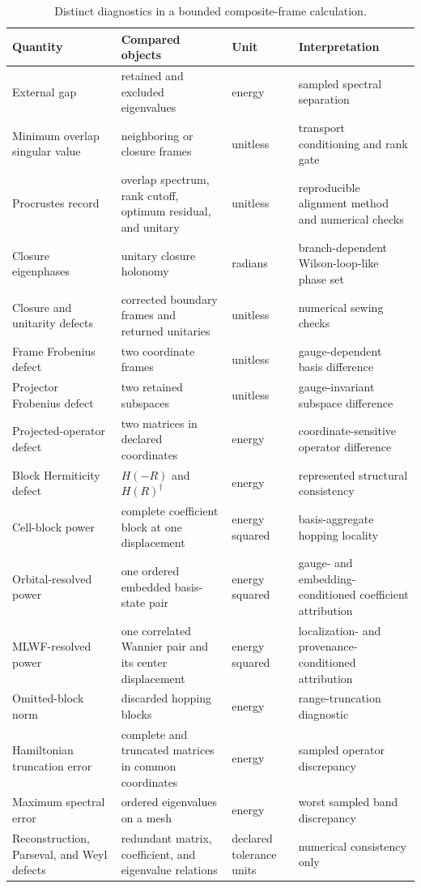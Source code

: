 \begin{table}[htbp]
  \centering
  \caption{Distinct diagnostics in a bounded composite-frame calculation.}
  \label{tab:training-composite-diagnostics}
  \footnotesize
  \begin{tabular}{@{}p{}p{}p{}p{}@{}}
    \toprule
    Quantity & Compared objects & Unit & Interpretation \\
    \midrule
    External gap & retained and excluded eigenvalues & energy & sampled spectral separation \\
    Minimum overlap singular value & neighboring or closure frames & unitless & transport conditioning and rank gate \\
    Procrustes record & overlap spectrum, rank cutoff, optimum residual, and unitary & unitless & reproducible alignment method and numerical checks \\
    Closure eigenphases & unitary closure holonomy & radians & branch-dependent Wilson-loop-like phase set \\
    Closure and unitarity defects & corrected boundary frames and returned unitaries & unitless & numerical sewing checks \\
    Frame Frobenius defect & two coordinate frames & unitless & gauge-dependent basis difference \\
    Projector Frobenius defect & two retained subspaces & unitless & gauge-invariant subspace difference \\
    Projected-operator defect & two matrices in declared coordinates & energy & coordinate-sensitive operator difference \\
    Block Hermiticity defect & $H(-R)$ and $H(R)^{\dagger}$ & energy & represented structural consistency \\
    Cell-block power & complete coefficient block at one displacement & energy squared & basis-aggregate hopping locality \\
    Orbital-resolved power & one ordered embedded basis-state pair & energy squared & gauge- and embedding-conditioned coefficient attribution \\
    MLWF-resolved power & one correlated Wannier pair and its center displacement & energy squared & localization- and provenance-conditioned attribution \\
    Omitted-block norm & discarded hopping blocks & energy & range-truncation diagnostic \\
    Hamiltonian truncation error & complete and truncated matrices in common coordinates & energy & sampled operator discrepancy \\
    Maximum spectral error & ordered eigenvalues on a mesh & energy & worst sampled band discrepancy \\
    Reconstruction, Parseval, and Weyl defects & redundant matrix, coefficient, and eigenvalue relations & declared tolerance units & numerical consistency only \\
    \bottomrule
  \end{tabular}
\end{table}

